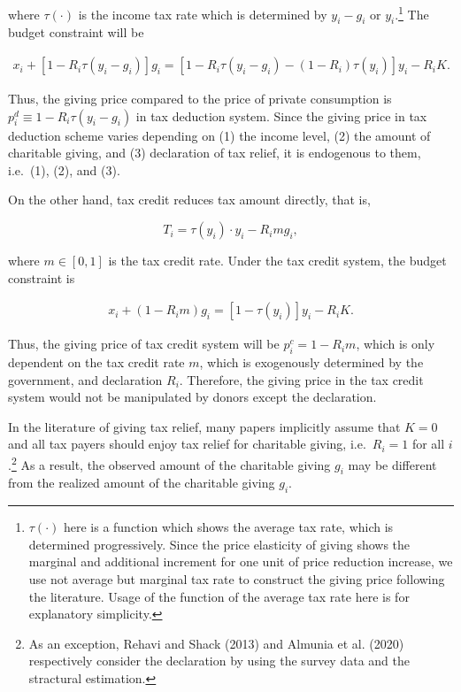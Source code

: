 \documentclass[
  11pt,
  a4paper,
]{article}
\begin{document}
where \(\tau(\cdot)\) is the income tax rate which is determined by \(y_i - g_i\) or \(y_i\).\footnote{\(\tau(\cdot)\) here is a function which shows the average tax rate, which is determined progressively. Since the price elasticity of giving shows the marginal and additional increment for one unit of price reduction increase, we use not average but marginal tax rate to construct the giving price following the literature. Usage of the function of the average tax rate here is for explanatory simplicity.} The budget constraint will be

\begin{align}
    x_i + [1 - R_i\tau(y_i - g_i)]g_i = [1 - R_i\tau(y_i - g_i)-(1-R_i)\tau(y_i)] y_i− R_iK.
\end{align}

Thus, the giving price compared to the price of private consumption is \(p_i^{d} \equiv 1 - R_i\tau(y_i - g_i)\) in tax deduction system. Since the giving price in tax deduction scheme varies depending on (1) the income level, (2) the amount of charitable giving, and (3) declaration of tax relief, it is endogenous to them, i.e.~(1), (2), and (3).

On the other hand, tax credit reduces tax amount directly, that is,

\[
    T_i = \tau(y_i)\cdot y_i - R_im g_i ,
\]

where \(m \in [0, 1]\) is the tax credit rate. Under the tax credit system, the budget constraint is

\begin{align}
    x_i + (1 - R_im) g_i = [1 - \tau(y_i)] y_i − R_iK.
\end{align}

Thus, the giving price of tax credit system will be \(p_i^c = 1 - R_im\), which is only dependent on the tax credit rate \(m\), which is exogenously determined by the government, and declaration \(R_i\).
Therefore, the giving price in the tax credit system would not be manipulated by donors except the declaration.

In the literature of giving tax relief, many papers implicitly assume that \(K=0\) and all tax payers should enjoy tax relief for charitable giving, i.e.~\(R_i=1\) for all \(i\).\footnote{As an exception, Rehavi and Shack (2013) and Almunia et al. (2020) respectively consider the declaration by using the survey data and the stractural estimation.} As a result, the observed amount of the charitable giving \(g_i\) may be different from the realized amount of the charitable giving \(g_i\).
\end{document}
